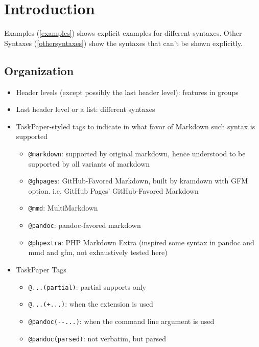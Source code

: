 \chapter{Introduction}
\label{introduction}

Examples (\autoref{examples}) shows explicit examples for different syntaxes. Other Syntaxes (\autoref{othersyntaxes}) show the syntaxes that can't be shown explicitly.

\section{Organization}
\label{organization}

\begin{itemize}
\item Header levels (except possibly the last header level): features in groups

\item Last header level or a list: different syntaxes

\item TaskPaper-styled tags to indicate in what favor of Markdown such syntax is supported

\begin{itemize}
\item \texttt{@markdown}: supported by original markdown, hence understood to be supported by all variants of markdown

\item \texttt{@ghpages}: GitHub-Favored Markdown, built by kramdown with GFM option. i.e. GitHub Pages' GitHub-Favored Markdown

\item \texttt{@mmd}: MultiMarkdown 

\item \texttt{@pandoc}: pandoc-favored markdown

\item \texttt{@phpextra}: PHP Markdown Extra (inspired some syntax in pandoc and mmd and gfm, not exhaustively tested here)

\end{itemize}

\item TaskPaper Tags

\begin{itemize}
\item \texttt{@...(partial)}: partial supports only

\item \texttt{@...(+...)}: when the extension is used

\item \texttt{@pandoc(-{}-...)}: when the command line argument is used

\item \texttt{@pandoc(parsed)}: not verbatim, but parsed

\end{itemize}

\end{itemize}

